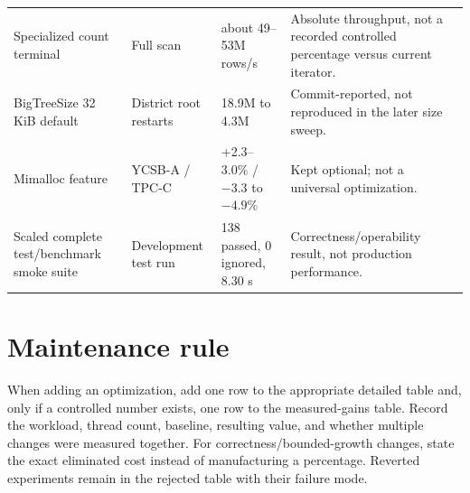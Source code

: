 \documentclass[10pt,a4paper,landscape]{article}
\begin{document}
\begin{longtable}{p{6.1cm}p{5.2cm}p{5.5cm}p{6.6cm}}
Specialized count terminal & Full scan & about 49--53M rows/s & Absolute throughput, not a
recorded controlled percentage versus current iterator. \\
BigTreeSize 32 KiB default & District root restarts & 18.9M to 4.3M & Commit-reported,
not reproduced in the later size sweep. \\
Mimalloc feature & YCSB-A / TPC-C & +2.3--3.0\% / $-3.3$ to $-4.9$\% & Kept optional;
not a universal optimization. \\
Scaled complete test/benchmark smoke suite & Development test run & 138 passed, 0 ignored,
8.30 s & Correctness/operability result, not production performance. \\
\bottomrule
\end{longtable}

\section*{Maintenance rule}

When adding an optimization, add one row to the appropriate detailed table and, only if
a controlled number exists, one row to the measured-gains table. Record the workload,
thread count, baseline, resulting value, and whether multiple changes were measured
together. For correctness/bounded-growth changes, state the exact eliminated cost instead
of manufacturing a percentage. Reverted experiments remain in the rejected table with
their failure mode.
\end{document}
